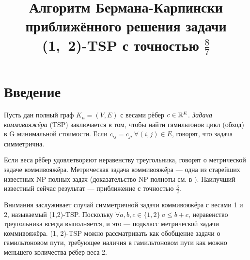 

\usepackage[]{algorithm2e}

\usepackage{subfig}


\usepackage{tikz}
\newcommand*\circled[1]{\tikz[baseline=(char.base)]{
		\node[shape=circle,draw,inner sep=1pt] (char) {#1};}}
	
\newtheorem{theorem}{Теорема}

\renewcommand{\G}{\mathcal{G}}


\title{Алгоритм Бермана-Карпински приближённого решения задачи \mbox{(1, 2)-TSP} с точностью $\frac{8}{7}$}
\date{}
\author{}

\maketitle

%

\section{Введение}
Пусть дан полный граф $K_n = (V, E)$ с весами рёбер $c \in \mathbb{R}^E$. \textit{Задача коммивояжёра} (TSP) заключается в том, чтобы найти гамильтонов цикл (обход) в G минимальной стоимости. Если $c_{ij} = c_{ji}\ \forall (i, j)  \in E$, говорят, что задача симметрична. 

Если веса рёбер удовлетворяют неравенству треугольника, говорят о метрической задаче коммивояжёра. Метрическая задача коммивояжёра --- одна из старейших известных NP-полных задач (доказательство NP-полноты см. в \cite{JP85}). Наилучший известный сейчас результат --- приближение с точностью $\frac{3}{2}$\cite{C76}. 

Внимания заслуживает случай симметричной задачи коммивояжёра с весами 1 и 2, называемый (1,2)-TSP. Поскольку $\forall a, b, c \in \{1, 2\} \ a\le b+c$, неравенство треугольника всегда выполняется, и это --- подкласс метрической задачи коммивояжёра. (1, 2)-TSP можно рассматривать как обобщение задачи о гамильтоновом пути, требующее наличия в гамильтоновом пути как можно меньшего количества рёбер веса 2.

